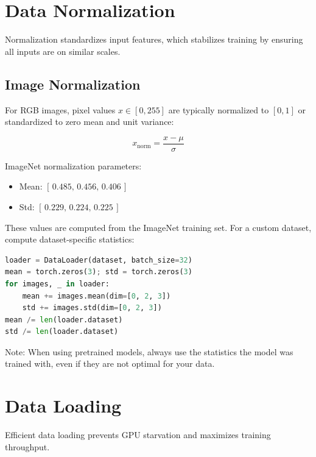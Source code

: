 \section{Data Normalization}

Normalization standardizes input features, which stabilizes training by ensuring all inputs are on similar scales.

\subsection{Image Normalization}

For RGB images, pixel values $x \in [0, 255]$ are typically normalized to $[0, 1]$ or standardized to zero mean and unit variance:

\begin{equation}
x_{\text{norm}} = \frac{x - \mu}{\sigma}
\end{equation}

ImageNet normalization parameters:
\begin{itemize}
    \item Mean: $[\,0.485,\, 0.456,\, 0.406\,]$
    \item Std: $[\,0.229,\, 0.224,\, 0.225\,]$
\end{itemize}

These values are computed from the ImageNet training set. For a custom dataset, compute dataset-specific statistics:

\begin{lstlisting}[language=python]
loader = DataLoader(dataset, batch_size=32)
mean = torch.zeros(3); std = torch.zeros(3)
for images, _ in loader:
    mean += images.mean(dim=[0, 2, 3])
    std += images.std(dim=[0, 2, 3])
mean /= len(loader.dataset)
std /= len(loader.dataset)
\end{lstlisting}

Note: When using pretrained models, always use the statistics the model was trained with, even if they are not optimal for your data.

\section{Data Loading}

Efficient data loading prevents GPU starvation and maximizes training throughput.

